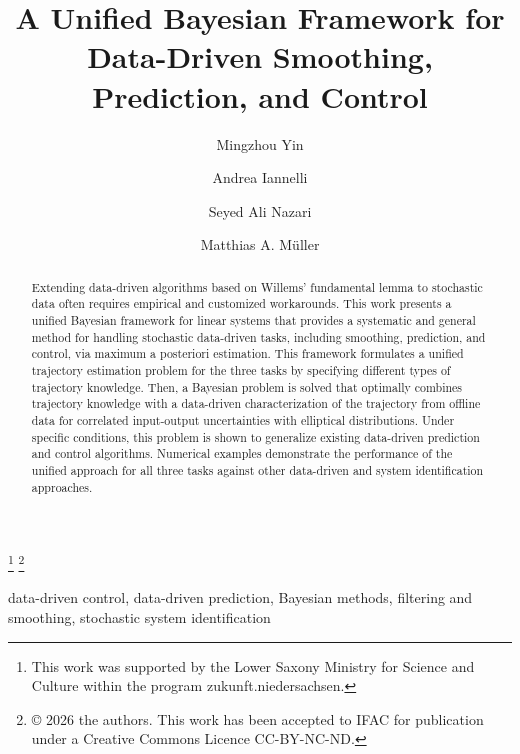 \documentclass{ifacconf}
\begin{document}
\begin{frontmatter}

\title{A Unified Bayesian Framework for Data-Driven Smoothing, Prediction, and Control} 

\thanks[footnoteinfo]{This work was supported by the Lower Saxony Ministry for Science and Culture within the program zukunft.niedersachsen.}
\thanks{© 2026 the authors. This work has been accepted to IFAC for publication under a Creative Commons Licence CC-BY-NC-ND.}

\author[First]{Mingzhou Yin} 
\author[Second]{Andrea Iannelli} 
\author[First]{Seyed Ali Nazari} 
\author[First]{Matthias A. Müller}

\address[First]{Institute of Automatic Control, Leibniz University Hannover, 30167 Hannover, Germany (e-mail: yin@irt.uni-hannover.de, ali.nazari@stud.uni-hannover.de, mueller@irt.uni-hannover.de).}
\address[Second]{Institute for Systems Theory and Automatic Control, University of Stuttgart, 70569 Stuttgart, Germany (e-mail: andrea.iannelli@ist.uni-stuttgart.de)}

\begin{abstract}                %
Extending data-driven algorithms based on Willems' fundamental lemma to stochastic data often requires empirical and customized workarounds. This work presents a unified Bayesian framework for linear systems that provides a systematic and general method for handling stochastic data-driven tasks, including smoothing, prediction, and control, via maximum a posteriori estimation. This framework formulates a unified trajectory estimation problem for the three tasks by specifying different types of trajectory knowledge. Then, a Bayesian problem is solved that optimally combines trajectory knowledge with a data-driven characterization of the trajectory from offline data for correlated input-output uncertainties with elliptical distributions. Under specific conditions, this problem is shown to generalize existing data-driven prediction and control algorithms. Numerical examples demonstrate the performance of the unified approach for all three tasks against other data-driven and system identification approaches.
\end{abstract}

\begin{keyword}
data-driven control, data-driven prediction, Bayesian methods, filtering and smoothing, stochastic system identification
\end{keyword}

\end{frontmatter}
\end{document}
